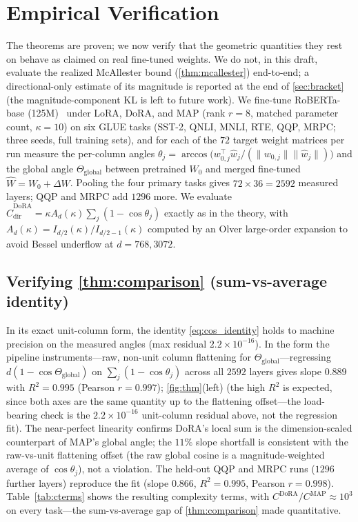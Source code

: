 \documentclass[10pt]{article}
\newcommand{\Ad}{A_d}
\newcommand{\Thetaglob}{\Theta_{\mathrm{global}}}
\begin{document}
\section{Empirical Verification}
\label{sec:experiments}
The theorems are proven; we now verify that the geometric quantities they rest on
behave as claimed on real fine-tuned weights. We do not, in this draft, evaluate the
realized McAllester bound (\cref{thm:mcallester}) end-to-end; a directional-only
estimate of its magnitude is reported at the end of \cref{sec:bracket} (the
magnitude-component KL is left to future work). We fine-tune RoBERTa-base
(125M)~\cite{liu2019roberta} under LoRA, DoRA, and MAP (rank $r{=}8$, matched
parameter count, $\kappa{=}10$) on six GLUE tasks (SST-2, QNLI, MNLI, RTE, QQP, MRPC;
three seeds, full training sets), and for each of the $72$ target weight matrices per run
measure the per-column angles $\theta_j=\arccos\!\big(w_{0,j}^\top\hat w_j/(\|w_{0,j}\|\|\hat w_j\|)\big)$
and the global angle $\Thetaglob$ between pretrained $W_0$ and merged fine-tuned
$\hat W=W_0+\Delta W$. Pooling the four primary tasks gives $72\times36=2592$ measured
layers; QQP and MRPC add $1296$ more. We evaluate
$\widehat C^{\mathrm{DoRA}}_{\mathrm{dir}}=\kappa \Ad(\kappa)\sum_j(1-\cos\theta_j)$ exactly as
in the theory, with $\Ad(\kappa)=I_{d/2}(\kappa)/I_{d/2-1}(\kappa)$ computed by an Olver
large-order expansion to avoid Bessel underflow at $d=768,3072$.

\subsection{Verifying \cref{thm:comparison} (sum-vs-average identity)}
In its exact unit-column form, the identity \eqref{eq:cos_identity} holds to machine
precision on the measured angles (max residual $2.2\times10^{-16}$). In the form the
pipeline instruments---raw, non-unit column flattening for $\Thetaglob$---regressing
$d(1-\cos\Thetaglob)$ on $\sum_j(1-\cos\theta_j)$ across all $2592$ layers gives slope
$0.889$ with $R^2=0.995$ (Pearson $r=0.997$); \cref{fig:thm}(left) (the high $R^2$ is
expected, since both axes are the same quantity up to the flattening offset---the
load-bearing check is the $2.2\times10^{-16}$ unit-column residual above, not the
regression fit). The near-perfect
linearity confirms DoRA's local sum is the dimension-scaled counterpart of MAP's
global angle; the $11\%$ slope shortfall is consistent with the raw-vs-unit flattening
offset (the raw global cosine is a magnitude-weighted average of $\cos\theta_j$), not a
violation. The held-out QQP and MRPC runs ($1296$ further layers) reproduce the fit
(slope $0.866$, $R^2=0.995$, Pearson $r=0.998$). Table~\ref{tab:cterms} shows the resulting complexity terms, with
$C^{\mathrm{DoRA}}/C^{\mathrm{MAP}}\approx10^3$ on every task---the sum-vs-average gap of
\cref{thm:comparison} made quantitative.
\end{document}
